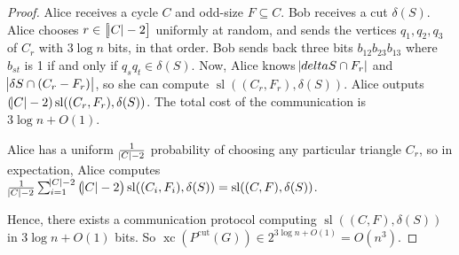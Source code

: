 \documentclass{article}
\DeclareMathOperator{\xc}{xc}
\DeclareMathOperator{\Sl}{sl}
\begin{document}
\begin{proof}
Alice receives a cycle $C$ and odd-size $F\subseteq C$. Bob receives
a cut $\delta(S)$. Alice chooses $r\in \sbr{\abs{C}-2}$ uniformly
at random, and sends the vertices $q_1,q_2,q_3$ of $C_r$ with $3\log n$ bits,
in that order.
Bob sends back three bits $b_{12}b_{23}b_{13}$ where $b_{st}$ is 1
if and only if $q_sq_t \in\delta(S)$.
Now, Alice knows $\abs{delta{S}\cap F_r}$ and $\abs{\delta{S}\cap (C_r-F_r)}$,
so she can compute $\Sl((C_r, F_r),\delta(S))$. Alice outputs
$(\abs{C}-2)\Sl((C_r,F_r),\delta(S))$. The total cost
of the communication is $3\log n + O(1)$.

Alice has a uniform $\frac{1}{\abs{C}-2}$ probability of choosing
any particular triangle $C_r$, so in expectation, Alice computes
$\frac{1}{\abs{C}-2}\sum_{i=1}^{\abs{C}-2}\del{\abs{C}-2}\Sl((C_i,F_i),\delta(S)) = \Sl((C,F), \delta(S))$. 

Hence, there exists a communication protocol computing 
$\Sl((C,F), \delta(S))$ in $3\log n+O(1)$ bits. 
So $\xc(P^{\text{cut}}(G)) \in 2^{3\log n + O(1)} = O(n^3)$. 
\end{proof}
\end{document}
